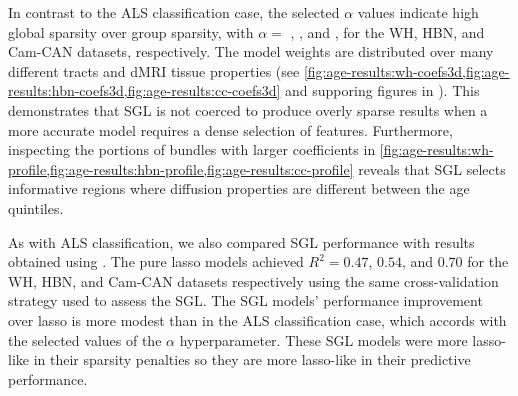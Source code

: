 \documentclass[10pt,letterpaper]{article}
\begin{document}
In contrast to the ALS classification case, the selected $\alpha$ values
indicate high global sparsity over group sparsity, with $\alpha = $
{\whLRatio}, {\hbnLRatio}, and {\ccLRatio}, for the WH, HBN, and Cam-CAN
datasets, respectively. The model weights are distributed over many different
tracts and dMRI tissue properties (see
\cref{fig:age-results:wh-coefs3d,fig:age-results:hbn-coefs3d,fig:age-results:cc-coefs3d}
and supporing figures in ).
This demonstrates that SGL is not coerced to produce overly sparse results
when a more accurate model requires a dense selection of features.
Furthermore, inspecting the portions of bundles with larger coefficients in
\cref{fig:age-results:wh-profile,fig:age-results:hbn-profile,fig:age-results:cc-profile}
reveals that SGL selects informative regions where diffusion properties are
different between the age quintiles.

As with ALS classification, we also compared SGL performance with results
obtained using
.
The pure lasso models achieved $R^2 = 0.47$, $0.54$, and $0.70$ for the WH, HBN, and Cam-CAN datasets respectively using the same cross-validation strategy used to assess the SGL.
The SGL models'
performance improvement over lasso is more modest than in the ALS
classification case, which accords with the selected values of the $\alpha$
hyperparameter. These SGL models were more lasso-like in their sparsity
penalties so they are more lasso-like in their predictive performance.

\end{document}
